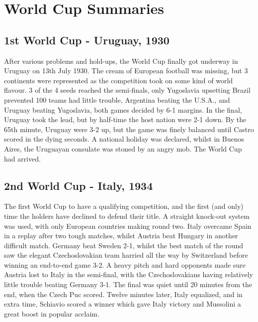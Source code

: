 \chapter{World Cup Summaries}
\newline
\newline
\section{1st World Cup - Uruguay, 1930}
After various problems and hold-ups, the World Cup finally got underway in 
Uruguay on 13th July 1930. The cream of European football was missing, but 3 
continents were represented as the competition took on some kind of world 
flavour. 3 of the 4 seeds reached the semi-finals, only Yugoslavia upsetting 
Brazil prevented 100%
teams had little trouble, Argentina beating the U.S.A., and Uruguay beating 
Yugoslavia, both games decided by 6-1 margins. In the final, Uruguay took the
lead, but by half-time the host nation were 2-1 down. By the 65th minute, 
Uruguay were 3-2 up, but the game was finely balanced until Castro scored in
the dying seconds. A national holiday was declared, whilst in Buenos Aires, the
Uruguayan consulate was stoned by an angry mob. The World Cup had arrived.
\section{2nd World Cup - Italy, 1934}
The first World Cup to have a qualifying competition, and the first (and only)
time the holders have declined to defend their title. A straight knock-out 
system was used, with only European countries making round two. Italy overcame
Spain in a replay after two tough matches, whilst Austria beat Hungary in 
another difficult match. Germany beat Sweden 2-1, whilst the best match of the
round saw the elegant Czechoslovakian team harried all the way by Switzerland 
before winning an end-to-end game 3-2. A heavy pitch and hard opponents made 
sure Austria lost to Italy in the semi-final, with the Czechoslovakians having 
relatively little trouble beating Germany 3-1. The final was quiet until 20 
minutes from the end, when the Czech Puc scored. Twelve minutes later, Italy 
equalized, and in extra time, Schiavio scored a winner which gave Italy victory
and Mussolini a great boost in popular acclaim.

